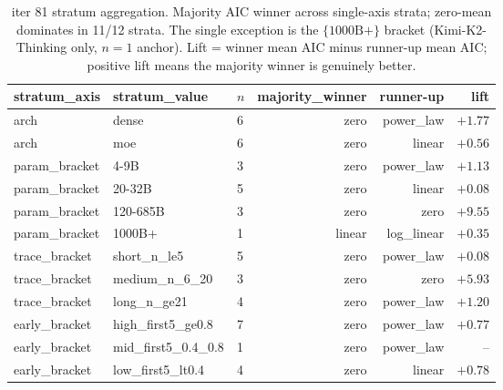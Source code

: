\begin{table}[h]
\centering
\small
\caption{iter 81 stratum aggregation.  Majority AIC winner across
single-axis strata; zero-mean dominates in 11/12 strata.  The single
exception is the $\{1000\mathrm{B}+\}$ bracket (Kimi-K2-Thinking only,
$n=1$ anchor).  Lift = winner mean AIC minus runner-up mean AIC;
positive lift means the majority winner is genuinely better.}
\label{tab:iter81-strat-lift}
\begin{tabular}{lllrrr}
\hline
stratum\_axis & stratum\_value & $n$ & majority\_winner & runner-up & lift \\
\hline
arch & dense & 6 & zero & power\_law & $+1.77$ \\
arch & moe & 6 & zero & linear & $+0.56$ \\
param\_bracket & 4-9B & 3 & zero & power\_law & $+1.13$ \\
param\_bracket & 20-32B & 5 & zero & linear & $+0.08$ \\
param\_bracket & 120-685B & 3 & zero & zero & $+9.55$ \\
param\_bracket & 1000B+ & 1 & linear & log\_linear & $+0.35$ \\
trace\_bracket & short\_n\_le5 & 5 & zero & power\_law & $+0.08$ \\
trace\_bracket & medium\_n\_6\_20 & 3 & zero & zero & $+5.93$ \\
trace\_bracket & long\_n\_ge21 & 4 & zero & power\_law & $+1.20$ \\
early\_bracket & high\_first5\_ge0.8 & 7 & zero & power\_law & $+0.77$ \\
early\_bracket & mid\_first5\_0.4\_0.8 & 1 & zero & power\_law & -- \\
early\_bracket & low\_first5\_lt0.4 & 4 & zero & linear & $+0.78$ \\
\hline
\end{tabular}
\end{table}

